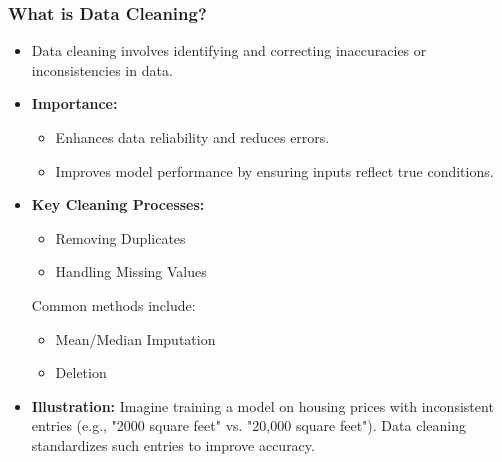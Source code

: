 \documentclass[aspectratio=169]{beamer}
\begin{document}
\begin{frame}[fragile]
    \frametitle{What is Data Cleaning?}
    \begin{itemize}
        \item Data cleaning involves identifying and correcting inaccuracies or inconsistencies in data.
        \item \textbf{Importance:}
        \begin{itemize}
            \item Enhances data reliability and reduces errors.
            \item Improves model performance by ensuring inputs reflect true conditions.
        \end{itemize}
        \item \textbf{Key Cleaning Processes:}
        \begin{itemize}
            \item Removing Duplicates
            \item Handling Missing Values
            \end{itemize}
            Common methods include:
            \begin{itemize}
                \item Mean/Median Imputation
                \item Deletion
            \end{itemize}
            \item \textbf{Illustration:} 
            Imagine training a model on housing prices with inconsistent entries (e.g., "2000 square feet" vs. "20,000 square feet"). Data cleaning standardizes such entries to improve accuracy.
    \end{itemize}
\end{frame}
\end{document}
